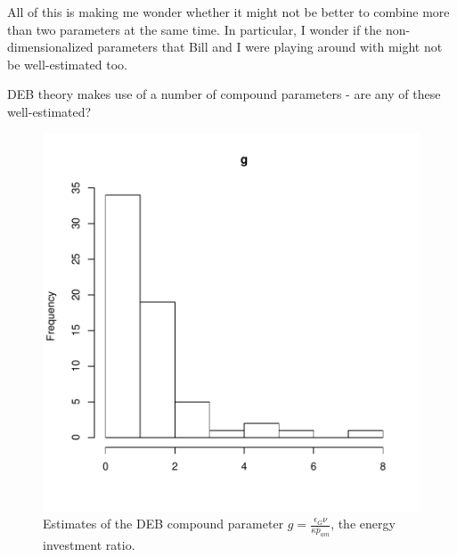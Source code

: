 \documentclass[12pt,reqno,final]{amsart}
\theoremstyle{plain}
\numberwithin{equation}{part}
\begin{document}
All of this is making me wonder whether it might not be better to
combine more than two parameters at the same time. In particular, I
wonder if the non-dimensionalized parameters that Bill and I were
playing around with might not be well-estimated too.

DEB theory makes use of a number of compound parameters - are any of
these well-estimated?

\begin{figure}
\includegraphics{Solving_the_problem_of_parameter_covariation-010}
\caption{Estimates of the DEB compound parameter $g =
  \frac{\epsilon_G \nu}{\kappa p_{am}}$, the energy investment
  ratio.}
\end{figure}
\end{document}

